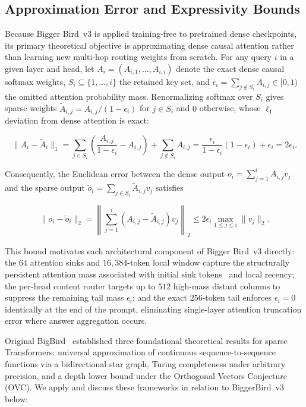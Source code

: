 \documentclass[11pt]{article}
\begin{document}
\subsection{Approximation Error and Expressivity Bounds}

Because Bigger Bird~v3 is applied training-free to pretrained dense checkpoints, its primary theoretical objective is approximating dense causal attention rather than learning new multi-hop routing weights from scratch. For any query $i$ in a given layer and head, let $A_i = (A_{i,1}, \dots, A_{i,i})$ denote the exact dense causal softmax weights, $S_i \subseteq \{1, \dots, i\}$ the retained key set, and $\epsilon_i = \sum_{j \notin S_i} A_{i,j} \in [0, 1)$ the omitted attention probability mass. Renormalizing softmax over $S_i$ gives sparse weights $\tilde{A}_{i,j} = A_{i,j} / (1 - \epsilon_i)$ for $j \in S_i$ and $0$ otherwise, whose $\ell_1$ deviation from dense attention is exact: 

\begin{equation}
\lVert A_i - \tilde{A}_i \rVert_1
  = \sum_{j \in S_i} \left(\frac{A_{i,j}}{1 - \epsilon_i} - A_{i,j}\right)
  + \sum_{j \notin S_i} A_{i,j}
  = \frac{\epsilon_i}{1 - \epsilon_i}(1 - \epsilon_i) + \epsilon_i
  = 2\epsilon_i.
\label{eq:l1-mass-error}
\end{equation}

Consequently, the Euclidean error between the dense output $o_i = \sum_{j=1}^i A_{i,j} v_j$ and the sparse output $\tilde{o}_i = \sum_{j \in S_i} \tilde{A}_{i,j} v_j$ satisfies

\begin{equation}
\lVert o_i - \tilde{o}_i \rVert_2
  = \left\lVert \sum_{j=1}^i (A_{i,j} - \tilde{A}_{i,j}) v_j \right\rVert_2
  \le 2\epsilon_i \max_{1 \le j \le i} \lVert v_j \rVert_2.
\label{eq:l2-output-error}
\end{equation}

This bound motivates each architectural component of Bigger Bird~v3 directly: the $64$ attention sinks and $16{,}384$-token local window capture the structurally persistent attention mass associated with initial sink tokens~\cite{xiao2024streamingllm} and local recency; the per-head content router targets up to $512$ high-mass distant columns to suppress the remaining tail mass $\epsilon_i$; and the exact $256$-token tail enforces $\epsilon_i = 0$ identically at the end of the prompt, eliminating single-layer attention truncation error where answer aggregation occurs.

Original BigBird~\cite{zaheer2020bigbird} established three foundational theoretical results for sparse Transformers: universal approximation of continuous sequence-to-sequence functions via a bidirectional star graph, Turing completeness under arbitrary precision, and a depth lower bound under the Orthogonal Vectors Conjecture (OVC). We apply and discuss these frameworks in relation to BiggerBird~v3 below:
\end{document}
